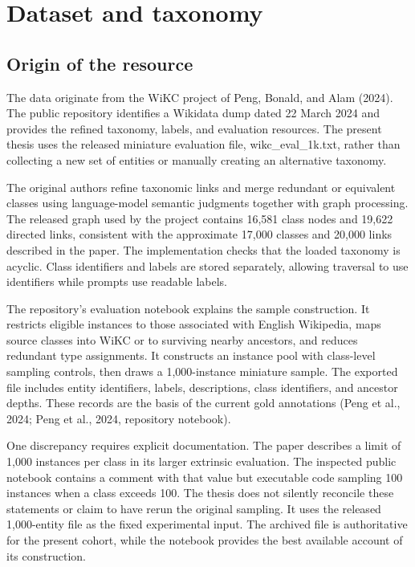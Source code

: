 \chapter{Dataset and taxonomy}

\FloatBarrier

\section{Origin of the resource}

The data originate from the WiKC project of Peng, Bonald, and Alam (2024). The public repository identifies a Wikidata dump dated 22 March 2024 and provides the refined taxonomy, labels, and evaluation resources. The present thesis uses the released miniature evaluation file, wikc\_\allowbreak{}eval\_\allowbreak{}1k.txt, rather than collecting a new set of entities or manually creating an alternative taxonomy.


The original authors refine taxonomic links and merge redundant or equivalent classes using language-model semantic judgments together with graph processing. The released graph used by the project contains 16,581 class nodes and 19,622 directed links, consistent with the approximate 17,000 classes and 20,000 links described in the paper. The implementation checks that the loaded taxonomy is acyclic. Class identifiers and labels are stored separately, allowing traversal to use identifiers while prompts use readable labels.


The repository’s evaluation notebook explains the sample construction. It restricts eligible instances to those associated with English Wikipedia, maps source classes into WiKC or to surviving nearby ancestors, and reduces redundant type assignments. It constructs an instance pool with class-level sampling controls, then draws a 1,000-instance miniature sample. The exported file includes entity identifiers, labels, descriptions, class identifiers, and ancestor depths. These records are the basis of the current gold annotations (Peng et al., 2024; Peng et al., 2024, repository notebook).


One discrepancy requires explicit documentation. The paper describes a limit of 1,000 instances per class in its larger extrinsic evaluation. The inspected public notebook contains a comment with that value but executable code sampling 100 instances when a class exceeds 100. The thesis does not silently reconcile these statements or claim to have rerun the original sampling. It uses the released 1,000-entity file as the fixed experimental input. The archived file is authoritative for the present cohort, while the notebook provides the best available account of its construction.


